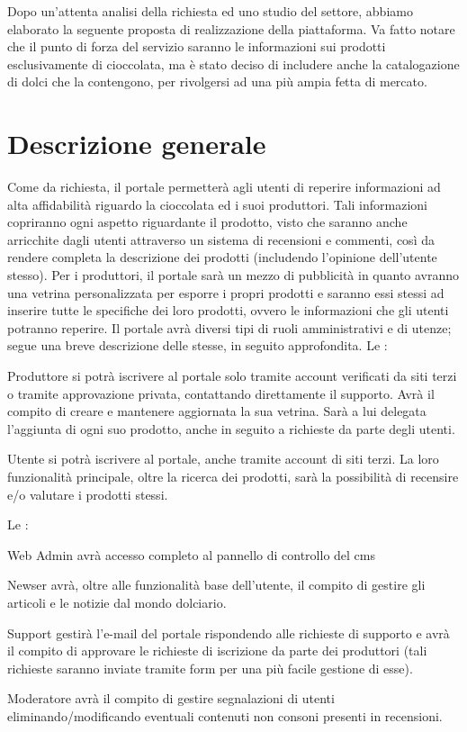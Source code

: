 Dopo un’attenta analisi della richiesta ed uno studio del settore, abbiamo elaborato la seguente proposta di realizzazione della piattaforma. Va fatto notare che il punto di forza del servizio saranno le informazioni sui prodotti esclusivamente di cioccolata, ma è stato deciso di includere anche la catalogazione di dolci che la contengono, per rivolgersi ad una più ampia fetta di mercato.

\section{Descrizione generale}
Come da richiesta, il portale permetterà agli utenti di reperire informazioni ad alta affidabilità riguardo la cioccolata ed i suoi produttori.
Tali informazioni copriranno ogni aspetto riguardante il prodotto, visto che saranno anche arricchite dagli utenti attraverso un sistema di recensioni e commenti, così da rendere completa la descrizione dei prodotti (includendo l'opinione dell'utente stesso).
Per i produttori, il portale sarà un mezzo di pubblicità in quanto avranno una vetrina personalizzata per esporre i propri prodotti e saranno essi stessi ad inserire tutte le specifiche dei loro prodotti, ovvero le informazioni che gli utenti potranno reperire.
Il portale avrà diversi tipi di ruoli amministrativi e di utenze; segue una breve descrizione delle stesse, in seguito approfondita. 
Le :
\begin{descriptionInd}
    \item[Produttore] si potrà iscrivere al portale solo tramite account verificati da siti terzi o tramite approvazione privata, contattando direttamente il supporto. Avrà il compito di creare e mantenere aggiornata la sua vetrina. Sarà a lui delegata l’aggiunta di ogni suo prodotto, anche in seguito a richieste da parte degli utenti.
    
    \item[Utente] si potrà iscrivere al portale, anche tramite account di siti terzi. La loro funzionalità principale, oltre la ricerca dei prodotti, sarà la possibilità di recensire e/o valutare i prodotti stessi. 
\end{descriptionInd}
Le :
\begin{descriptionInd}
    \item[Web Admin] avrà accesso completo al pannello di controllo del \gls{cms}
    
    \item[Newser] avrà, oltre alle funzionalità base dell’utente, il compito di gestire gli articoli e le notizie dal mondo dolciario.
    
    \item[Support] gestirà l’e-mail del portale rispondendo alle richieste di supporto e avrà il compito di approvare le richieste di iscrizione da parte dei produttori (tali richieste saranno inviate tramite form per una più facile gestione di esse).
    
    \item[Moderatore] avrà il compito di gestire segnalazioni di utenti eliminando/modificando eventuali contenuti non consoni presenti in recensioni.
\end{descriptionInd}

